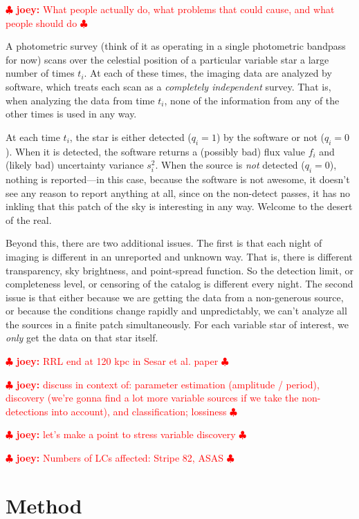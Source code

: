 \documentclass[12pt,preprint]{aastex}
\newcommand{\joey}[1] { \textcolor{red} {
\ensuremath{\clubsuit} {\bf joey:}  {#1}
\ensuremath{\clubsuit} } }%
\begin{document}
\joey{What people actually do, what problems that could cause, and what people should do}

A photometric survey (think of it as operating in a single photometric
bandpass for now) scans over the celestial position of a particular
variable star  a large number of times $t_i$.  At each of these
times, the imaging data are analyzed by software, which
treats each scan as a \emph{completely independent} survey.  That is,
when analyzing the data from time $t_i$, none of the information from
any of the other times is used in any way.




At each time $t_i$, the star is either detected ($q_i=1$) by the
software or not ($q_i=0$).  When it is detected, the software returns
a (possibly bad) flux value $f_i$ and (likely bad) uncertainty
variance $s_i^2$.  When the source is \emph{not} detected ($q_i=0$),
nothing is reported---in this case, because the software is not
awesome, it doesn't see any reason to report anything at all, since on
the non-detect passes, it has no inkling that this patch of the sky is
interesting in any way.  Welcome to the desert of the real.

Beyond this, there are two additional issues.  The first is that each
night of imaging is different in an unreported and unknown way.  That
is, there is different transparency, sky brightness, and point-spread
function.  So the detection limit, or completeness level, or censoring
of the catalog is different every night.  The second issue is that
either because we are getting the data from a non-generous source, or
because the conditions change rapidly and unpredictably, we can't
analyze all the sources in a finite patch simultaneously.  For each
variable star of interest, we \emph{only} get the data on that star
itself.

\joey{RRL end at 120 kpc in Sesar et al. paper}

\joey{discuss in context of: parameter estimation (amplitude / period), discovery (we're gonna find a lot more variable sources if we take the non-detections into account), and classification; lossiness}

\joey{let's make a point to stress variable discovery}

\joey{Numbers of LCs affected: Stripe 82, ASAS}




\section{Method}
\label{sec:method}
\end{document}
